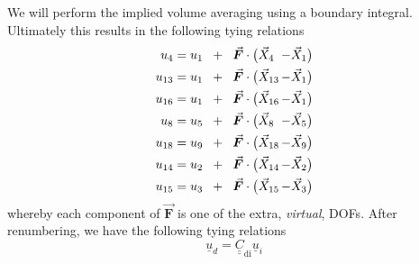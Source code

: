 \documentclass[times,namecite]{goose-article}
\begin{document}
We will perform the implied volume averaging using a boundary integral. Ultimately this results in the following tying relations
\begin{equation}
\begin{aligned}
  u_{ 4} &= u_{ 1} \hspace*{2mm} + \hspace*{2mm} \vec{\bm{F}} \cdot \big( \vec{X}_{ 4} \hspace*{-3mm}&- \vec{X}_{ 1} \big)  \\
  u_{13} &= u_{ 1} \hspace*{2mm} + \hspace*{2mm} \vec{\bm{F}} \cdot \big( \vec{X}_{13} \hspace*{-3mm}&- \vec{X}_{ 1} \big)  \\
  u_{16} &= u_{ 1} \hspace*{2mm} + \hspace*{2mm} \vec{\bm{F}} \cdot \big( \vec{X}_{16} \hspace*{-3mm}&- \vec{X}_{ 1} \big)  \\
  u_{ 8} &= u_{ 5} \hspace*{2mm} + \hspace*{2mm} \vec{\bm{F}} \cdot \big( \vec{X}_{ 8} \hspace*{-3mm}&- \vec{X}_{ 5} \big)  \\
  u_{18} &= u_{ 9} \hspace*{2mm} + \hspace*{2mm} \vec{\bm{F}} \cdot \big( \vec{X}_{18} \hspace*{-3mm}&- \vec{X}_{ 9} \big)  \\
  u_{14} &= u_{ 2} \hspace*{2mm} + \hspace*{2mm} \vec{\bm{F}} \cdot \big( \vec{X}_{14} \hspace*{-3mm}&- \vec{X}_{ 2} \big)  \\
  u_{15} &= u_{ 3} \hspace*{2mm} + \hspace*{2mm} \vec{\bm{F}} \cdot \big( \vec{X}_{15} \hspace*{-3mm}&- \vec{X}_{ 3} \big)
  \label{eq:tyings:global}
\end{aligned}
\end{equation}
whereby each component of $\vec{\bm{F}}$ is one of the extra, \emph{virtual}, DOFs. After renumbering, we have the following tying relations
\begin{equation}
  \underline{u}_{d} = \underline{\underline{C}}_\mathrm{di} \underline{u}_{i}
\end{equation}
\end{document}

